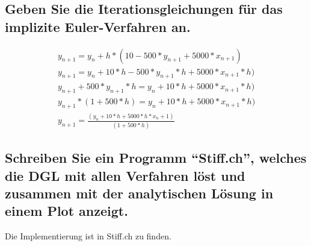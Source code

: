 \documentclass[10pt,a4paper]{article}
\begin{document}
\subsection{Geben Sie die Iterationsgleichungen für das implizite Euler-Verfahren an.}
\begin{subequations}
\begin{align}
y_{n+1} = y_n + h * (10 - 500 * y_{n+1} + 5000 * x_{n+1})\\
y_{n+1} = y_n + 10 * h - 500 * y_{n+1} * h + 5000 * x_{n+1} * h)\\
y_{n+1} + 500 * y_{n+1} * h = y_n + 10 * h + 5000 * x_{n+1} * h)\\
y_{n+1} * (1+ 500 * h) = y_n + 10 * h + 5000 * x_{n+1} * h)\\
y_{n+1} = \frac{(y_n + 10 * h + 5000 * h * x_n+1)}{ (1+500*h)}
\end{align}
\end{subequations}

\subsection{Schreiben Sie ein Programm "`Stiff.ch"', welches die DGL mit allen Verfahren
löst und zusammen mit der analytischen Lösung in einem Plot anzeigt.}

Die Implementierung ist in Stiff.ch zu finden.
\end{document}
